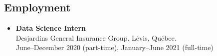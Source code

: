 \documentclass[11pt,]{scrartcl}
\begin{document}
\subsection{Employment}\label{professional-activities}
\begin{itemize}
  \leftskip-0.25in
  \item \textbf{Data Science Intern}\\
  Desjardins General Insurance Group. L\'{e}vis, Qu\'{e}bec.\\
  June--December 2020 (part-time), January--June 2021 (full-time)

\end{itemize}

%
\end{document}
